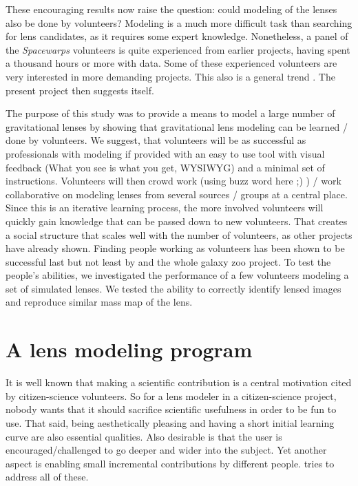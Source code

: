 These encouraging results now raise the question: could modeling of
the lenses also be done by volunteers?  Modeling is a much more
difficult task than searching for lens candidates, as it requires some
expert knowledge.  Nonetheless, a panel of the {\em Spacewarps\/}
volunteers is quite experienced from earlier projects, having spent a
thousand hours or more with data.  Some of these experienced
volunteers are very interested in more demanding projects.  This also
is a general trend \citep[cf.][]{Khatib22112011}.  The present project
then suggests itself.

The purpose of this study was to provide a means to model a large number of gravitational lenses by showing that gravitational lens modeling can be learned / done by volunteers.
We suggest, that volunteers will be as successful as professionals with modeling if provided with an easy to use tool with visual feedback (What you see is what you get, WYSIWYG) and a minimal set of instructions.
Volunteers will then crowd work (using buzz word here ;) ) / work collaborative on modeling lenses from several sources / groups at a central place.
Since this is an iterative learning process, the more involved volunteers will quickly gain knowledge that can be passed down to new volunteers.
That creates a social structure that scales well with the number of volunteers, as other projects have already shown. %
Finding people working as volunteers has been shown to be successful last but not least by \sw and the whole galaxy zoo project.
To test the people's abilities, we investigated the performance of a few volunteers modeling a set of simulated lenses.
We tested the ability to correctly identify lensed images and reproduce similar mass map of the lens.


\section{A lens modeling program}

It is well known that making a scientific contribution is a central
motivation cited by citizen-science volunteers.  So for a lens
modeler in a citizen-science project, nobody wants that it should
sacrifice scientific usefulness in order to be fun to use.  That said,
being aesthetically pleasing and having a short initial learning curve
are also essential qualities.  Also desirable is that the user is
encouraged/challenged to go deeper and wider into the subject.
Yet another aspect is enabling small incremental contributions
by different people.  \spl tries to address all of these.

